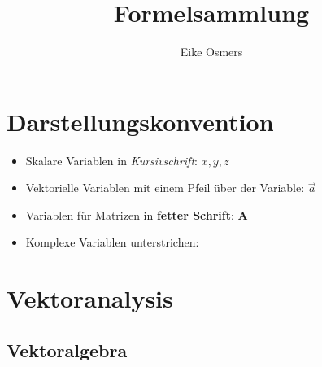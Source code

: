 \documentclass[a4paper]{article}
\begin{document}
\title{\textbf{{\Huge Formelsammlung}}}
\author{Eike Osmers}
\maketitle
\thispagestyle{empty}
\newpage

\thispagestyle{empty}
\setcounter{page}{0}
\tableofcontents
\newpage
\setcounter{page}{1}

\section{Darstellungskonvention}

\begin{itemize}
\item[] Skalare Variablen in \textit{Kursivschrift}: $x, y, z$
\item[] Vektorielle Variablen mit einem Pfeil über der Variable: $\vec{a}$
\item[] Variablen für Matrizen in \textbf{fetter Schrift}: $\mathbf{A}$
\item[] Komplexe Variablen unterstrichen: 
\end{itemize}

\section{Vektoranalysis}

\subsection{Vektoralgebra}
\end{document}
